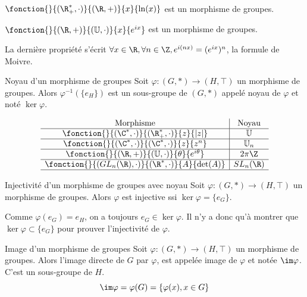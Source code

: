 \begin{exemple}
    $\fonction{}{(\R_+^*, \cdot)}{(\R, +)}{x}{\ln(x)}$ est un morphisme de groupes.
    
    $\fonction{}{(\R, +)}{(\mathbb U, \cdot)}{x}{e^{ix}}$ est un morphisme de groupes.

    La dernière propriété s'écrit $\forall x \in \R, \forall n \in \Z, e^{i(nx)} = (e^{ix})^n$, 
    la formule de Moivre.
\end{exemple}

\begin{theoreme}{Noyau d'un morphisme de groupes}{}
    Soit $\varphi : (G, \ast) \to (H, \top)$ un morphisme de groupes. 
    Alors $\varphi^{-1}(\{e_H\})$ est un sous-groupe de $(G, \ast)$ appelé noyau de 
    $\varphi$ et noté $\ker \varphi$.
\end{theoreme}

\begin{exemple}
    $$
    \begin{array}{c|c}
        \text{Morphisme} & \text{Noyau} \\ \hline
        \fonction{}{(\C^*, \cdot)}{(\R_+^*, \cdot)}{z}{|z|} & \mathbb U \\ \hline
        \fonction{}{(\C^*, \cdot)}{(\C^*, \cdot)}{z}{z^n} & \mathbb U_n \\ \hline
        \fonction{}{(\R, +)}{(\mathbb U, \cdot)}{\theta}{e^{i\theta}} & 2\pi \Z \\ \hline
        \fonction{}{(GL_n(\R), \cdot)}{(\R^*, \cdot)}{A}{\det(A)} & SL_n(\R) \\ \hline
    \end{array}$$
\end{exemple}

\begin{theoreme}{Injectivité d'un morphisme de groupes avec noyau}{}
    Soit $\varphi : (G, \ast) \to (H, \top)$ un morphisme de groupes.
    Alors $\varphi$ est injective ssi $\ker \varphi = \{e_G\}$.
\end{theoreme}

\begin{remarque}
    Comme $\varphi(e_G) = e_H$, on a toujours $e_G \in \ker \varphi$.
    Il n'y a donc qu'à montrer que $\ker \varphi \subset \{e_G\}$ pour prouver l'injectivité de $\varphi$.
\end{remarque}

\begin{proposition}{Image d'un morphisme de groupes}{}
    Soit $\varphi : (G, \ast) \to (H, \top)$ un morphisme de groupes. Alors l'image directe de 
    $G$ par $\varphi$, est appelée image de $\varphi$ et notée $\im \varphi$. C'est un sous-groupe de $H$.
    $$\im \varphi = \varphi(G) = \{\varphi(x), x \in G\}$$
    
\end{proposition}

